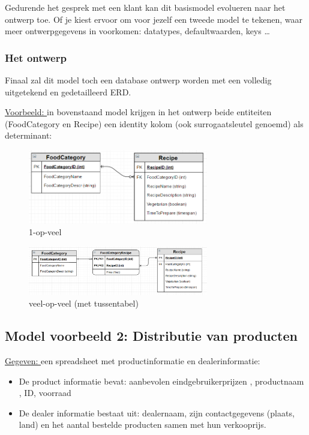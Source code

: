 \documentclass{article}
\begin{document}
Gedurende het gesprek met een klant kan dit basismodel evolueren naar het ontwerp toe.
Of je kiest ervoor om voor jezelf een tweede model te tekenen, waar meer ontwerpgegevens
in voorkomen: datatypes, defaultwaarden, keys \dots

\subsubsection{Het ontwerp}
Finaal zal dit model toch een database ontwerp worden met een volledig uitgetekend en gedetailleerd ERD.

\underline{Voorbeeld: } in bovenstaand model krijgen in het ontwerp beide entiteiten 
(FoodCategory en Recipe) een identity kolom (ook surrogaatsleutel genoemd) als determinant:

\begin{figure}[H]
    \centering
    \includegraphics[width=0.7\textwidth]{databaseontwerp.png}
    \caption{1-op-veel}
\end{figure}

\begin{figure}[H]
    \centering
    \includegraphics[width=0.7\textwidth]{veel-op-veel.png}
    \caption{veel-op-veel (met tussentabel)}
\end{figure}


\subsection{Model voorbeeld 2: Distributie van producten}

\underline{Gegeven: } een spreadsheet met productinformatie en dealerinformatie:

\begin{itemize}
    \item De product informatie bevat: aanbevolen eindgebruikerprijzen , productnaam , ID, voorraad
    \item De dealer informatie bestaat uit: dealernaam, zijn contactgegevens (plaats, land) en het aantal bestelde producten samen met hun verkooprijs.
\end{itemize}
\end{document}
